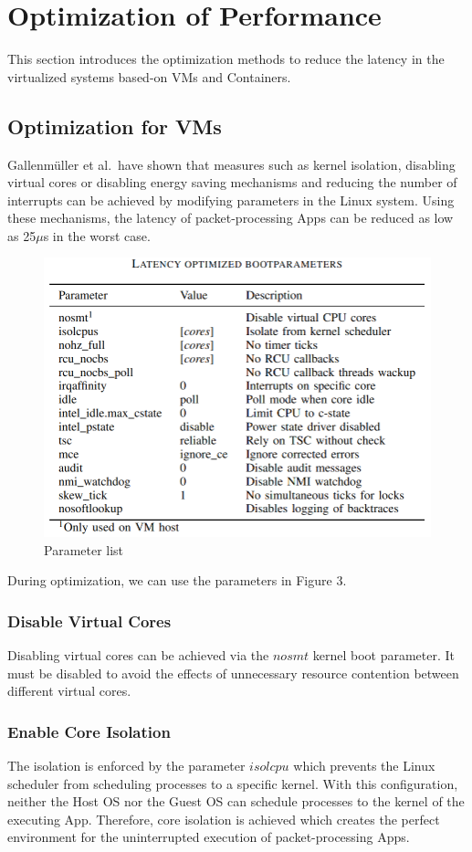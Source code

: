 \section{Optimization of Performance}
This section introduces the optimization methods to reduce the latency in the
virtualized systems based-on VMs and Containers.

\subsection{Optimization for VMs}
Gallenmüller et al.\ have shown that measures such as kernel isolation,
disabling virtual cores or disabling energy saving mechanisms and reducing the number of
interrupts can be achieved by modifying parameters in the Linux system\cite{b13}.
Using these mechanisms, the latency of packet-processing Apps can be reduced as low as
\si{25}{$\mu$s} in the worst case.
\begin{figure}[h!]
    \centering
    \includegraphics[width=.4\textwidth]{pics/Optimization1.png}
    \caption{Parameter list\cite{b13}}
\end{figure}
During optimization, we can use the parameters in Figure 3.

\subsubsection{Disable Virtual Cores}
Disabling virtual cores can be achieved via the $nosmt$ kernel boot parameter\cite{b13}.
It must be disabled to avoid the effects of unnecessary resource contention between
different virtual cores.

\subsubsection{Enable Core Isolation}
The isolation is enforced by the parameter $isolcpu$ which prevents the Linux scheduler
from scheduling processes to a specific kernel\cite{b13}.
With this configuration, neither the Host OS nor the Guest OS can schedule processes to
the kernel of the executing App.
Therefore, core isolation is achieved which creates the perfect environment for
the uninterrupted execution of packet-processing Apps.

